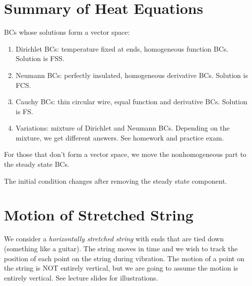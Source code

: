 \documentclass[class=article,crop=false]{standalone}
\begin{document}
\newpage
\section{Summary of Heat Equations}

BCs whose solutions form a vector space:
~\begin{enumerate}[label=\arabic*)]
	\item Dirichlet BCs: temperature fixed at ends, homogeneous function BCs. Solution is FSS.
	\item Neumann BCs: perfectly insulated, homogeneous derivative BCs. Solution is FCS.
	\item Cauchy BCs: thin circular wire, equal function and derivative BCs. Solution is FS.
	\item Variations: mixture of Dirichlet and Neumann BCs. Depending on the mixture, we get different answers. See homework and practice exam.
\end{enumerate}
For those that don't form a vector space, we move the nonhomogeneous part to the steady state BCs.
\begin{note}[]
The initial condition changes after removing the steady state component.
\end{note}

\newpage
\section{Motion of Stretched String}
\begin{motivation}
	We consider a \emph{horizontally stretched string} with ends that are tied down (something like a guitar). The string moves in time and we wish to track the position of each point on the string during vibration. The motion of a point on the string is NOT entirely vertical, but we are going to assume the motion is entirely vertical. See lecture slides for illustrations.
\end{motivation}
\end{document}
